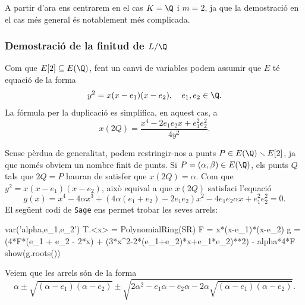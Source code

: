 %

A partir d'ara ens centrarem en el cas $K=\Q$ i $m=2$, ja que la demostració en el cas més general és notablement més complicada.

\subsubsection{Demostració de la finitud de \texorpdfstring{$L/\Q$}{L/Q}}
 Com que $E[2]\subseteq E(\Q)$, fent un canvi de variables podem assumir que $E$ té equació de la forma
 \[
 y^2 = x (x-e_1)(x-e_2),\quad e_1,e_2\in\Q.
 \]
 La fórmula per la duplicació es simplifica, en aquest cas, a
 \[
 x(2Q) = \frac{x^4-2e_1e_2x + e_1^2e_2^2}{4y^2}.
 \]
 
 Sense pèrdua de generalitat, podem restringir-nos a punts $P\in E(\Q)\setminus E[2]$, ja que només obviem un nombre finit de punts. Si $P=(\alpha,\beta)\in E(\Q)$, els punts $Q$ tals que $2Q=P$ hauran de satisfer que $x(2Q)=\alpha$. Com que $y^2=x(x-e_1)(x-e_2)$, això equival a que $x(2Q)$ satisfaci l'equació
 \[
 g(x) = x^4 - 4\alpha x^3 + (4\alpha(e_1+e_2)-2e_1e_2)x^2-4e_1e_2\alpha x + e_1^2e_2^2= 0.
 \]
 El següent codi de \texttt{Sage} ens permet trobar les seves arrels:
 \begin{python}
 var('alpha,e_1,e_2')
 T.<x> = PolynomialRing(SR)
 F = x*(x-e_1)*(x-e_2)
 g = (4*F*(e_1 + e_2 - 2*x) + 
     (3*x^2-2*(e_1+e_2)*x+e_1*e_2)**2) -
     alpha*4*F
 show(g.roots())
 \end{python}
 Veiem que les arrels són de la forma
 \[
 \alpha \pm \sqrt{(\alpha-e_1)(\alpha-e_2)} \pm \sqrt{2\alpha^2-e_1\alpha-e_2\alpha - 2\alpha\sqrt{(\alpha-e_1)(\alpha-e_2)}}.
 \]
 
